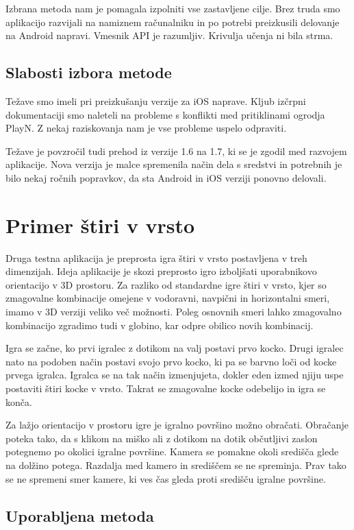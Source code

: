 Izbrana metoda nam je pomagala izpolniti vse zastavljene cilje. Brez truda smo aplikacijo razvijali na namiznem računalniku in po potrebi preizkusili delovanje na Android napravi. Vmesnik API je razumljiv. Krivulja učenja ni bila strma. 

\subsection{Slabosti izbora metode}

Težave smo imeli pri preizkušanju verzije za iOS naprave. Kljub izčrpni dokumentaciji smo naleteli na probleme s konflikti med pritiklinami ogrodja PlayN. Z nekaj raziskovanja nam je vse probleme uspelo odpraviti. 

Težave je povzročil tudi prehod iz verzije 1.6 na 1.7, ki se je zgodil med razvojem aplikacije. Nova verzija je malce spremenila način dela s sredstvi in potrebnih je bilo nekaj ročnih popravkov, da sta Android in iOS verziji ponovno delovali.

\section{Primer štiri v vrsto}

Druga testna aplikacija je preprosta igra štiri v vrsto postavljena v treh dimenzijah. Ideja aplikacije je skozi preprosto igro izboljšati uporabnikovo orientacijo v 3D prostoru. Za razliko od standardne igre štiri v vrsto, kjer so zmagovalne kombinacije omejene v vodoravni, navpični in horizontalni smeri, imamo v 3D verziji veliko več možnosti. Poleg osnovnih smeri lahko zmagovalno kombinacijo zgradimo tudi v globino, kar odpre obilico novih kombinacij.

Igra se začne, ko prvi igralec z dotikom na valj postavi prvo kocko. Drugi igralec nato na podoben način postavi svojo prvo kocko, ki pa se barvno loči od kocke prvega igralca. Igralca se na tak način izmenjujeta, dokler eden izmed njiju uspe postaviti štiri kocke v vrsto. Takrat se zmagovalne kocke odebelijo in igra se konča.

Za lažjo orientacijo v prostoru igre je igralno površino možno obračati. Obračanje poteka tako, da s klikom na miško ali z dotikom na dotik občutljivi zaslon potegnemo po okolici igralne površine. Kamera se pomakne okoli središča glede na dolžino potega. Razdalja med kamero in središčem se ne spreminja. Prav tako se ne spremeni smer kamere, ki ves čas gleda proti središču igralne površine.

\subsection{Uporabljena metoda}

